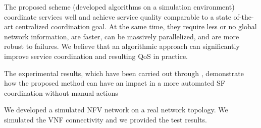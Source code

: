 The proposed scheme (developed algorithms on a simulation environment)  coordinate services well and achieve service quality comparable to a state of-the-art centralized coordination goal. At the same
time, they require less or no global network information, are
faster, can be massively parallelized, and are more robust to
failures. We  believe
that an algorithmic approach can significantly improve service
coordination and resulting QoS in practice.

The experimental results, which have been carried out through , demonstrate how the proposed method can have an impact in a more automated SF coordination without manual actions

We developed a simulated NFV network on a real network topology. We simulated the VNF connectivity and we provided the test results.
